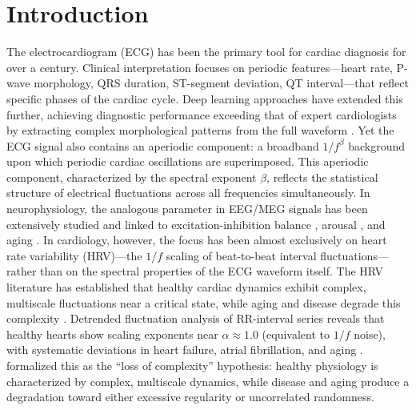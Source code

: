 \documentclass[11pt,a4paper]{article}
\begin{document}
\begin{abstract}
These results demonstrate that the spectral exponent captures a cross-population invariant of cardiac electrophysiology: the geometry of the twelve-lead $\beta$-vector is determined by conduction system anatomy and is reproducible across equipment, ethnicity, and geography.
\vspace{0.5em}
\noindent\textbf{Keywords:} electrocardiography, spectral exponent, 1/$f$ noise, IRASA, cardiac conduction, aging, PTB-XL, external validation, cross-population invariance
\end{abstract}
\newpage
\section{Introduction}
The electrocardiogram (ECG) has been the primary tool for cardiac diagnosis for over a century. Clinical interpretation focuses on periodic features---heart rate, P-wave morphology, QRS duration, ST-segment deviation, QT interval---that reflect specific phases of the cardiac cycle. Deep learning approaches have extended this further, achieving diagnostic performance exceeding that of expert cardiologists by extracting complex morphological patterns from the full waveform \citep{Strodthoff2021, Ribeiro2020}.
Yet the ECG signal also contains an aperiodic component: a broadband $1/f^\beta$ background upon which periodic cardiac oscillations are superimposed. This aperiodic component, characterized by the spectral exponent $\beta$, reflects the statistical structure of electrical fluctuations across all frequencies simultaneously. In neurophysiology, the analogous parameter in EEG/MEG signals has been extensively studied and linked to excitation-inhibition balance \citep{Gao2017}, arousal \citep{Lendner2020}, and aging \citep{Voytek2015}. In cardiology, however, the focus has been almost exclusively on heart rate variability (HRV)---the $1/f$ scaling of beat-to-beat interval fluctuations---rather than on the spectral properties of the ECG waveform itself.
The HRV literature has established that healthy cardiac dynamics exhibit complex, multiscale fluctuations near a critical state, while aging and disease degrade this complexity \citep{Goldberger2002}. Detrended fluctuation analysis of RR-interval series reveals that healthy hearts show scaling exponents near $\alpha \approx 1.0$ (equivalent to $1/f$ noise), with systematic deviations in heart failure, atrial fibrillation, and aging \citep{Peng1995, Ivanov1999}. \citet{Lipsitz1992} formalized this as the ``loss of complexity'' hypothesis: healthy physiology is characterized by complex, multiscale dynamics, while disease and aging produce a degradation toward either excessive regularity or uncorrelated randomness.
\end{document}
